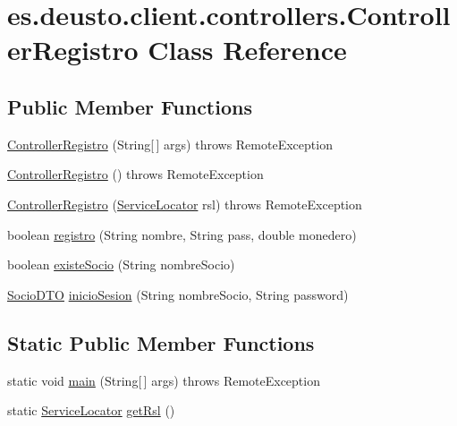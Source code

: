 \hypertarget{classes_1_1deusto_1_1client_1_1controllers_1_1_controller_registro}{}\section{es.\+deusto.\+client.\+controllers.\+Controller\+Registro Class Reference}
\label{classes_1_1deusto_1_1client_1_1controllers_1_1_controller_registro}
\subsection*{Public Member Functions}
\begin{DoxyCompactItemize}
\item 
\mbox{\hyperlink{classes_1_1deusto_1_1client_1_1controllers_1_1_controller_registro_ab9bc3c11869b65f0dd75b9f29d58599c}{Controller\+Registro}} (String\mbox{[}$\,$\mbox{]} args)  throws Remote\+Exception 
\item 
\mbox{\hyperlink{classes_1_1deusto_1_1client_1_1controllers_1_1_controller_registro_a3e3a9fb9a8b8f50f203f4a3d11b4fdd6}{Controller\+Registro}} ()  throws Remote\+Exception
\item 
\mbox{\hyperlink{classes_1_1deusto_1_1client_1_1controllers_1_1_controller_registro_ad5f876dd482f9c5e1c17b86a6766def2}{Controller\+Registro}} (\mbox{\hyperlink{classes_1_1deusto_1_1client_1_1remote_1_1_service_locator}{Service\+Locator}} rsl)  throws Remote\+Exception 
\item 
boolean \mbox{\hyperlink{classes_1_1deusto_1_1client_1_1controllers_1_1_controller_registro_ac0ee1a6563c41ca2f7c43feac48e5bf1}{registro}} (String nombre, String pass, double monedero)
\item 
boolean \mbox{\hyperlink{classes_1_1deusto_1_1client_1_1controllers_1_1_controller_registro_a2fdcf26f5a3624e5bbf1556de8843cbe}{existe\+Socio}} (String nombre\+Socio)
\item 
\mbox{\hyperlink{classes_1_1deusto_1_1server_1_1dto_1_1_socio_d_t_o}{Socio\+D\+TO}} \mbox{\hyperlink{classes_1_1deusto_1_1client_1_1controllers_1_1_controller_registro_ae0e09e53df499a47c78aa8c1c58dc4f0}{inicio\+Sesion}} (String nombre\+Socio, String password)
\end{DoxyCompactItemize}
\subsection*{Static Public Member Functions}
\begin{DoxyCompactItemize}
\item 
static void \mbox{\hyperlink{classes_1_1deusto_1_1client_1_1controllers_1_1_controller_registro_a24e524e2eeab5c84a32685fd5a8381c8}{main}} (String\mbox{[}$\,$\mbox{]} args)  throws Remote\+Exception 
\item 
static \mbox{\hyperlink{classes_1_1deusto_1_1client_1_1remote_1_1_service_locator}{Service\+Locator}} \mbox{\hyperlink{classes_1_1deusto_1_1client_1_1controllers_1_1_controller_registro_a46fa8e363b970e7f0524fb35b3e3af30}{get\+Rsl}} ()
\end{DoxyCompactItemize}



